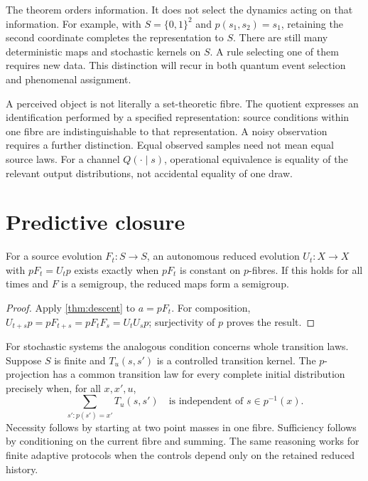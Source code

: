 The theorem orders information. It does not select the dynamics acting on that information. For example, with $S=\{0,1\}^2$ and $p(s_1,s_2)=s_1$, retaining the second coordinate completes the representation to $S$. There are still many deterministic maps and stochastic kernels on $S$. A rule selecting one of them requires new data. This distinction will recur in both quantum event selection and phenomenal assignment.

A perceived object is not literally a set-theoretic fibre. The quotient expresses an identification performed by a specified representation: source conditions within one fibre are indistinguishable to that representation. A noisy observation requires a further distinction. Equal observed samples need not mean equal source laws. For a channel $Q(\cdot\mid s)$, operational equivalence is equality of the relevant output distributions, not accidental equality of one draw.

\section{Predictive closure}\label{section:source:predictive-closure}
\begin{proposition}\label{prop:dyn-descent}
For a source evolution $F_t:S\to S$, an autonomous reduced evolution $U_t:X\to X$ with $pF_t=U_tp$ exists exactly when $pF_t$ is constant on $p$-fibres. If this holds for all times and $F$ is a semigroup, the reduced maps form a semigroup.
\end{proposition}
\begin{proof}
Apply \cref{thm:descent} to $a=pF_t$. For composition,
$U_{t+s}p=pF_{t+s}=pF_tF_s=U_tU_sp$; surjectivity of $p$ proves the result.
\end{proof}

For stochastic systems the analogous condition concerns whole transition laws. Suppose $S$ is finite and $T_u(s,s')$ is a controlled transition kernel. The $p$-projection has a common transition law for every complete initial distribution precisely when, for all $x,x',u$,
\begin{equation}\label{eq:lump}
\sum_{s':p(s')=x'}T_u(s,s')
\quad\text{is independent of }s\in p^{-1}(x).
\end{equation}
Necessity follows by starting at two point masses in one fibre. Sufficiency follows by conditioning on the current fibre and summing. The same reasoning works for finite adaptive protocols when the controls depend only on the retained reduced history.


